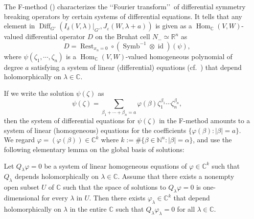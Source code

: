 The 
F-method (\cite[Thm.~4.1]{KP1})
 characterizes the \lq\lq{Fourier transform}\rq\rq\
 of differential symmetry breaking operators
 by certain systems
 of differential equations.  
It tells that 
 any element in ${\operatorname{Diff}}_{G'}
   (I_{\delta}(V,\lambda)|_{G'},J_{\varepsilon}(W,\lambda+a))$
 is given as a ${\operatorname{Hom}}_{\mathbb{C}}(V,W)$-valued
 differential operator $D$
 on the Bruhat cell $N_- \simeq {\mathbb{R}}^n$
 as 
\[
  D={\operatorname{Rest}}_{x_n=0} \circ ({\operatorname{Symb}}^{-1} \otimes {\operatorname{id}})(\psi), 
\]
 where $\psi(\zeta_1, \cdots, \zeta_n)$
 is a ${\operatorname{Hom}}_{\mathbb{C}}(V,W)$-valued homogeneous polynomial
 of degree $a$
 satisfying a system of linear (differential) equations
 (cf.~\cite[(4.3) and (4.4)]{KP1})
 that depend holomorphically on $\lambda \in {\mathbb{C}}$.  



If we write the solution $\psi(\zeta)$ as 
\[
  \psi(\zeta)=\sum_{\beta_1 + \cdots + \beta_n=a} 
              \varphi(\beta) \zeta_1^{\beta_1} \cdots \zeta_n^{\beta_n}, 
\]
then the system of differential equations
 for $\psi(\zeta)$ in the F-method
 amounts to a system 
 of linear (homogeneous) equations 
 for the coefficients $\{\varphi(\beta):|\beta|=a\}$.  
We regard $\varphi = (\varphi(\beta)) \in {\mathbb{C}}^k$
 where $k := \#\{\beta \in {\mathbb{N}}^n: |\beta|=\alpha\}$, 
 and use the following elementary lemma
 on the global basis of solutions:
\begin{lemma}
\label{lem:holoeq}
Let $Q_{\lambda}\varphi =0$ be a system
 of linear homogeneous equations
 of $\varphi \in {\mathbb{C}}^k$
 such that $Q_{\lambda}$ depends holomorphically on $\lambda \in {\mathbb{C}}$.  
Assume that there exists a nonempty open subset $U$ of ${\mathbb{C}}$
 such that the space of solutions to $Q_{\lambda} \varphi =0$
 is one-dimensional 
 for every $\lambda$ 
 in $U$.  
Then there exists $\varphi_{\lambda} \in {\mathbb{C}}^k$
 that depend holomorphically on $\lambda$
 in the entire ${\mathbb{C}}$
 such that $Q_{\lambda}\varphi_{\lambda} =0$
 for all $\lambda \in {\mathbb{C}}$.   
\end{lemma}

